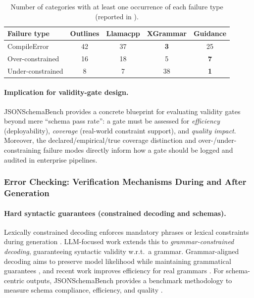 \begin{table}[t]
\centering
\small
\setlength{\tabcolsep}{6pt}
\renewcommand{\arraystretch}{1.12}
\begin{tabular}{@{}l c c c c@{}}
\toprule
\textbf{Failure type} & \textbf{Outlines} & \textbf{Llamacpp} & \textbf{XGrammar} & \textbf{Guidance} \\
\midrule
CompileError     & 42 & 37 & \textbf{3}  & 25 \\
Over-constrained & 16 & 18 & 5  & \textbf{7} \\
Under-constrained&  8 &  7 & 38 & \textbf{1} \\
\bottomrule
\end{tabular}
\caption{Number of categories with at least one occurrence of each failure type (reported in \cite{geng2025jsonschemabench}).}
\label{tab:jsonschemabench-failures}
\end{table}

\paragraph{Implication for validity-gate design.}
JSONSchemaBench \cite{geng2025jsonschemabench} provides a concrete blueprint for evaluating validity gates beyond mere ``schema pass rate'':
a gate must be assessed for \emph{efficiency} (deployability), \emph{coverage} (real-world constraint support), and \emph{quality impact}.
Moreover, the declared/empirical/true coverage distinction and over-/under-constraining failure modes directly inform how a gate should be logged and audited in enterprise pipelines.

\subsubsection{Error Checking: Verification Mechanisms During and After Generation}
\label{subsec:error-checking}

\paragraph{Hard syntactic guarantees (constrained decoding and schemas).}
Lexically constrained decoding enforces mandatory phrases or lexical constraints during generation \cite{hokamp2017lexically}.
LLM-focused work extends this to \emph{grammar-constrained decoding}, guaranteeing syntactic validity w.r.t.\ a grammar.
Grammar-aligned decoding aims to preserve model likelihood while maintaining grammatical guarantees \cite{park2024grammaraligned},
and recent work improves efficiency for real grammars \cite{park2025flexible}.
For schema-centric outputs, JSONSchemaBench provides a benchmark methodology to measure schema compliance, efficiency, and quality \cite{geng2025jsonschemabench}.

